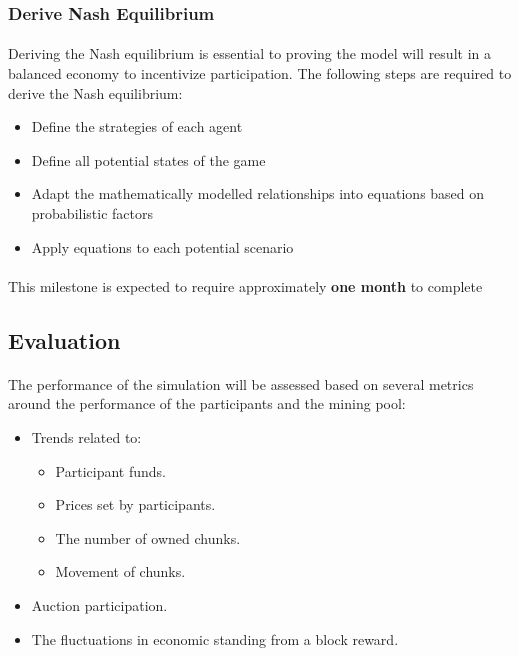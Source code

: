 \subsubsection{Derive Nash Equilibrium}

\paragraph{} Deriving the Nash equilibrium is essential to proving the model will result in a balanced economy to incentivize participation. The following steps are required to derive the Nash equilibrium:

\begin{itemize}
  \item Define the strategies of each agent
  \item Define all potential states of the game
  \item Adapt the mathematically modelled relationships into equations based on probabilistic factors
  \item Apply equations to each potential scenario
\end{itemize}

\paragraph{} This milestone is expected to require approximately \textbf{one month} to complete

\subsection{Evaluation}

\paragraph{} The performance of the simulation will be assessed based on several metrics around the performance of the participants and the mining pool:

\begin{itemize}
  \item Trends related to:
    \begin{itemize}
      \item Participant funds.
      \item Prices set by participants.
      \item The number of owned chunks.
      \item Movement of chunks.
    \end{itemize}
  \item Auction participation.
  \item The fluctuations in economic standing from a block reward.
\end{itemize}


